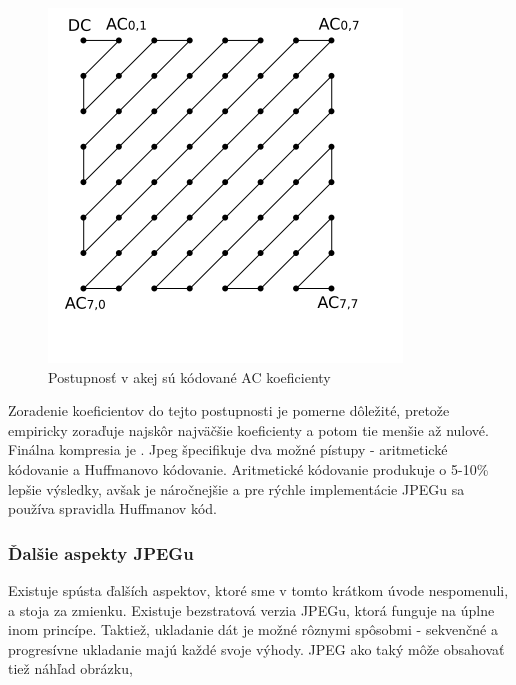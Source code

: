 \begin{figure}[htp]
    \centering
    \includegraphics{obrazky/informatika/image_compression/zig_zag}
    \caption{Postupnosť v akej sú kódované AC koeficienty}
    \label{fig:jpeg_zig_zag}
\end{figure}

Zoradenie koeficientov
do tejto postupnosti je pomerne dôležité, pretože empiricky zoraďuje
najskôr najväčšie koeficienty a potom tie menšie až nulové.
Finálna kompresia je . Jpeg špecifikuje dva možné
pístupy - aritmetické kódovanie a Huffmanovo kódovanie. Aritmetické
kódovanie produkuje o 5-10\% lepšie výsledky, avšak je náročnejšie a
pre rýchle implementácie JPEGu sa používa spravidla Huffmanov kód.

\subsubsection{Ďalšie aspekty JPEGu}

Existuje spústa ďalších aspektov, ktoré sme v tomto krátkom úvode
nespomenuli, a stoja za zmienku. Existuje bezstratová verzia JPEGu,
ktorá funguje na úplne inom princípe. Taktiež, ukladanie dát je možné
rôznymi spôsobmi - sekvenčné a progresívne ukladanie majú každé svoje
výhody. JPEG ako taký môže obsahovať tiež náhľad obrázku, 



%
